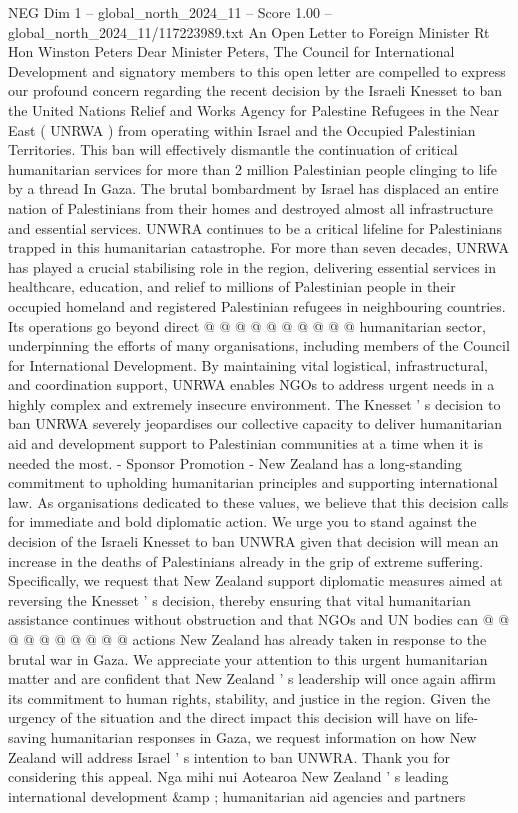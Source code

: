 \begin{textsample}{NEG Dim 1 – global\_north\_2024\_11 – Score 1.00 – global\_north\_2024\_11/117223989.txt}  \label{ex:f1_neg_225}
An Open Letter to Foreign Minister Rt Hon Winston Peters Dear Minister Peters, The Council for International Development and signatory members to this open letter are compelled to express our profound concern regarding the recent decision by the Israeli Knesset to ban the United Nations Relief and Works Agency for Palestine Refugees in the Near East ( UNRWA ) from operating within Israel and the Occupied Palestinian Territories.
This ban will effectively dismantle the continuation of critical humanitarian services for more than 2 million Palestinian people clinging to life by a thread In Gaza.
The brutal bombardment by Israel has displaced an entire nation of Palestinians from their homes and destroyed almost all infrastructure and essential services.
UNWRA continues to be a critical lifeline for Palestinians trapped in this humanitarian catastrophe.
For more than seven decades, UNRWA has played a crucial stabilising role in the region, delivering essential services in healthcare, education, and relief to millions of Palestinian people in their occupied homeland and registered Palestinian refugees in neighbouring countries.
Its operations go beyond direct @ @ @ @ @ @ @ @ @ @ humanitarian sector, underpinning the efforts of many organisations, including members of the Council for International Development.
By maintaining vital logistical, infrastructural, and coordination support, UNRWA enables NGOs to address urgent needs in a highly complex and extremely insecure environment.
The Knesset ' s decision to ban UNRWA severely jeopardises our collective capacity to deliver humanitarian aid and development support to Palestinian communities at a time when it is needed the most. - Sponsor Promotion - New Zealand has a long-standing commitment to upholding humanitarian principles and supporting international law.
As organisations dedicated to these values, we believe that this decision calls for immediate and bold diplomatic action.
We urge you to stand against the decision of the Israeli Knesset to ban UNWRA given that decision will mean an increase in the deaths of Palestinians already in the grip of extreme suffering.
Specifically, we request that New Zealand support diplomatic measures aimed at reversing the Knesset ' s decision, thereby ensuring that vital humanitarian assistance continues without obstruction and that NGOs and UN bodies can @ @ @ @ @ @ @ @ @ @ actions New Zealand has already taken in response to the brutal war in Gaza.
We appreciate your attention to this urgent humanitarian matter and are confident that New Zealand ' s leadership will once again affirm its commitment to human rights, stability, and justice in the region.
Given the urgency of the situation and the direct impact this decision will have on life-saving humanitarian responses in Gaza, we request information on how New Zealand will address Israel ' s intention to ban UNWRA.
Thank you for considering this appeal.
Nga mihi nui Aotearoa New Zealand ' s leading international development \&amp ; humanitarian aid agencies and partners

\end{textsample}

